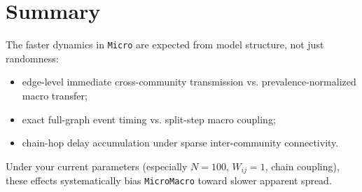 \documentclass[11pt]{article}
\begin{document}
\section*{Summary}
The faster dynamics in \texttt{Micro} are expected from model structure, not just randomness:
\begin{itemize}
\item edge-level immediate cross-community transmission vs. prevalence-normalized macro transfer;
\item exact full-graph event timing vs. split-step macro coupling;
\item chain-hop delay accumulation under sparse inter-community connectivity.
\end{itemize}
Under your current parameters (especially \(N=100\), \(W_{ij}=1\), chain coupling), these effects systematically bias \texttt{MicroMacro} toward slower apparent spread.
\end{document}
